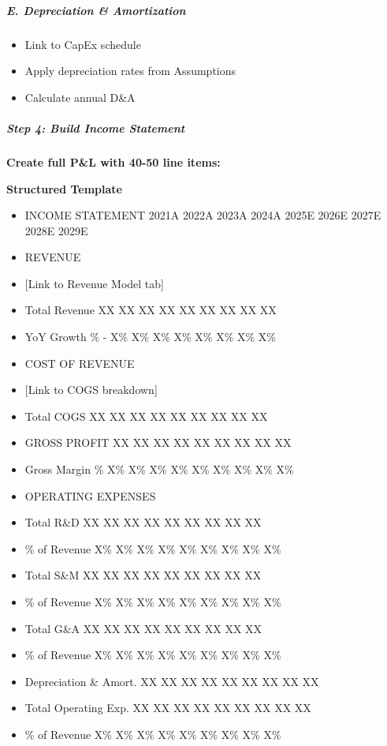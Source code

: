 \documentclass[11pt]{article}
\begin{document}
\subparagraph{E. Depreciation \& Amortization}\mbox{}\par
\begin{itemize}[leftmargin=*,itemsep=2pt,topsep=2pt]
\item {} Link to CapEx schedule
\item {} Apply depreciation rates from Assumptions
\item {} Calculate annual D\&A
\end{itemize}

\subparagraph{Step 4: Build Income Statement}\mbox{}\par

\textbf{Create full P\&L with 40-50 line items:}


\textbf{Structured Template}
\begin{itemize}[leftmargin=*,itemsep=2pt,topsep=2pt]
\item {} INCOME STATEMENT 2021A 2022A 2023A 2024A 2025E 2026E 2027E 2028E 2029E
\item {} REVENUE
\item {} [Link to Revenue Model tab]
\item {} Total Revenue XX XX XX XX XX XX XX XX XX
\item {} YoY Growth \% - X\% X\% X\% X\% X\% X\% X\% X\%
\item {} COST OF REVENUE
\item {} [Link to COGS breakdown]
\item {} Total COGS XX XX XX XX XX XX XX XX XX
\item {} GROSS PROFIT XX XX XX XX XX XX XX XX XX
\item {} Gross Margin \% X\% X\% X\% X\% X\% X\% X\% X\% X\%
\item {} OPERATING EXPENSES
\item {} Total R\&D XX XX XX XX XX XX XX XX XX
\item {} \% of Revenue X\% X\% X\% X\% X\% X\% X\% X\% X\%
\item {} Total S\&M XX XX XX XX XX XX XX XX XX
\item {} \% of Revenue X\% X\% X\% X\% X\% X\% X\% X\% X\%
\item {} Total G\&A XX XX XX XX XX XX XX XX XX
\item {} \% of Revenue X\% X\% X\% X\% X\% X\% X\% X\% X\%
\item {} Depreciation \& Amort. XX XX XX XX XX XX XX XX XX
\item {} Total Operating Exp. XX XX XX XX XX XX XX XX XX
\item {} \% of Revenue X\% X\% X\% X\% X\% X\% X\% X\% X\%

\end{itemize}
\end{document}
